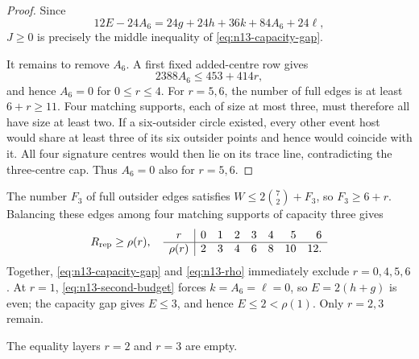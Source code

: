 \begin{proof}
Since
\[
 12E-24A_6=24g+24h+36k+84A_6+24\ell,
\]
$J\geq0$ is precisely the middle inequality of
\eqref{eq:n13-capacity-gap}.

It remains to remove $A_6$.  A first fixed added-centre row gives
\[
 2388A_6\leq453+414r,
\]
and hence $A_6=0$ for $0\leq r\leq4$.  For $r=5,6$, the number of full
edges is at least $6+r\geq11$.  Four matching supports, each of size at
most three, must therefore all have size at least two.  If a six-outsider
circle existed, every other event host would share at least three of its
six outsider points and hence would coincide with it.  All four signature
centres would then lie on its trace line, contradicting the three-centre
cap.  Thus $A_6=0$ also for $r=5,6$.
\end{proof}

The number $F_3$ of full outsider edges satisfies
\(W\leq2\binom72+F_3\), so $F_3\geq6+r$.  Balancing these edges among four
matching supports of capacity three gives
\begin{equation}
 R_{\rm rep}\geq\rho(r),\quad
\begin{array}{c|rrrrrrr}
r&0&1&2&3&4&5&6\\ \hline
\rho(r)&2&3&4&6&8&10&12.
\end{array}                                        \label{eq:n13-rho}
\end{equation}
Together, \eqref{eq:n13-capacity-gap} and \eqref{eq:n13-rho} immediately
exclude $r=0,4,5,6$.  At $r=1$, \eqref{eq:n13-second-budget} forces
$k=A_6=\ell=0$, so $E=2(h+g)$ is even; the capacity gap gives $E\leq3$,
and hence $E\leq2<\rho(1)$.  Only $r=2,3$ remain.

\begin{lemma}
\label{lem:n13-three-residue}
The equality layers $r=2$ and $r=3$ are empty.
\end{lemma}

